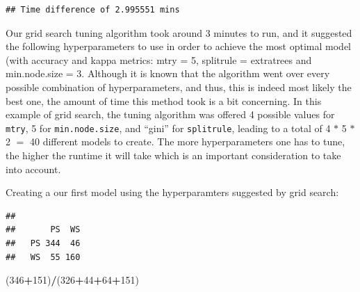 \documentclass[12pt]{article}
\newenvironment{Shaded}{\begin{snugshade}}{\end{snugshade}}
\newcommand{\CommentTok}[1]{\textcolor[rgb]{0.56,0.35,0.01}{\textit{#1}}}
\newcommand{\DataTypeTok}[1]{\textcolor[rgb]{0.13,0.29,0.53}{#1}}
\newcommand{\DecValTok}[1]{\textcolor[rgb]{0.00,0.00,0.81}{#1}}
\newcommand{\KeywordTok}[1]{\textcolor[rgb]{0.13,0.29,0.53}{\textbf{#1}}}
\newcommand{\NormalTok}[1]{#1}
\newcommand{\OperatorTok}[1]{\textcolor[rgb]{0.81,0.36,0.00}{\textbf{#1}}}
\newcommand{\StringTok}[1]{\textcolor[rgb]{0.31,0.60,0.02}{#1}}
\begin{document}
\begin{verbatim}
## Time difference of 2.995551 mins
\end{verbatim}

Our grid search tuning algorithm took around 3 minutes to run, and it
suggested the following hyperparameters to use in order to achieve the
most optimal model (with accuracy and kappa metrics: mtry = 5, splitrule
= extratrees and min.node.size = 3. Although it is known that the
algorithm went over every possible combination of hyperparameters, and
thus, this is indeed most likely the best one, the amount of time this
method took is a bit concerning. In this example of grid search, the
tuning algorithm was offered 4 possible values for \texttt{mtry}, 5 for
\texttt{min.node.size}, and ``gini'' for \texttt{splitrule}, leading to
a total of 4 \(*\) 5 \(*\) 2 \(=\) 40 different models to create. The
more hyperparameters one has to tune, the higher the runtime it will
take which is an important consideration to take into account.

Creating a our first model using the hyperparamters suggested by grid
search:

\begin{Shaded}
\end{Shaded}

\begin{verbatim}
##     
##       PS  WS
##   PS 344  46
##   WS  55 160
\end{verbatim}

\begin{Shaded}
\begin{Highlighting}[]
\NormalTok{(}\DecValTok{346}\OperatorTok{+}\DecValTok{151}\NormalTok{)}\OperatorTok{/}\NormalTok{(}\DecValTok{326}\OperatorTok{+}\DecValTok{44}\OperatorTok{+}\DecValTok{64}\OperatorTok{+}\DecValTok{151}\NormalTok{)}
\end{Highlighting}
\end{Shaded}
\end{document}
